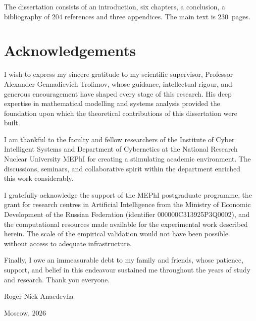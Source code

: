 The dissertation consists of an introduction, six chapters, a conclusion, a bibliography of 204 references and three appendices. The main text is 230~pages.


\chapter*{Acknowledgements}

I wish to express my sincere gratitude to my scientific supervisor, Professor Alexander Gennadievich Trofimov, whose guidance, intellectual rigour, and generous encouragement have shaped every stage of this research. His deep expertise in mathematical modelling and systems analysis provided the foundation upon which the theoretical contributions of this dissertation were built.

I am thankful to the faculty and fellow researchers of the Institute of Cyber Intelligent Systems and Department of Cybernetics at the National Research Nuclear University MEPhI for creating a stimulating academic environment. The discussions, seminars, and collaborative spirit within the department enriched this work considerably.

I gratefully acknowledge the support of the MEPhI postgraduate programme, the grant for research centres in Artificial Intelligence from the Ministry of Economic Development of the Russian Federation (identifier 000000C313925P3Q0002), and the computational resources made available for the experimental work described herein. The scale of the empirical validation would not have been possible without access to adequate infrastructure.

Finally, I owe an immeasurable debt to my family and friends, whose patience, support, and belief in this endeavour sustained me throughout the years of study and research. Thank you everyone.

\hfill Roger Nick Anaedevha

\hfill Moscow, 2026


